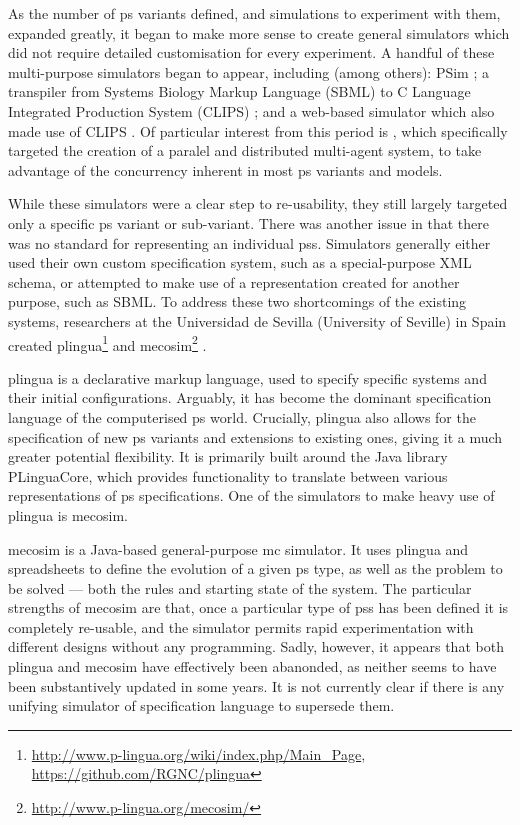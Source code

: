 As the number of \gls{ps} variants defined, and simulations to experiment with them, expanded greatly, it began to make more sense to create general simulators which did not require detailed customisation for every experiment.  A handful of these multi-purpose simulators began to appear, including (among others): PSim \cite{Bianco2007,Bianco2007a}; a transpiler from Systems Biology Markup Language (SBML) to C Language Integrated Production System (CLIPS) \cite{NepomucenoChamorro2005};  and a web-based simulator which also made use of CLIPS \cite{Bonchis2005}.  Of particular interest from this period is \cite{Acampora2007}, which specifically targeted the creation of a paralel and distributed multi-agent system, to take advantage of the concurrency inherent in most \gls{ps} variants and models.

While these simulators were a clear step to re-usability, they still largely targeted only a specific \gls{ps} variant or sub-variant.  There was another issue in that there was no standard for representing an individual \glspl{ps}.  Simulators generally either used their own custom specification system, such as a special-purpose XML schema, or attempted to make use of a representation created for another purpose, such as SBML.  To address these two shortcomings of the existing systems, researchers at the Universidad de Sevilla (University of Seville) in Spain created \gls{plingua}\footnote{\url{http://www.p-lingua.org/wiki/index.php/Main_Page}, \url{https://github.com/RGNC/plingua}} \cite{Diaz-Pernil2008a,Garcia-Quismondo2010} and \gls{mecosim}\footnote{\url{http://www.p-lingua.org/mecosim/}} \cite{Perez-Hurtado2010}.

\Gls{plingua} is a declarative markup language, used to specify specific systems and their initial configurations.  Arguably, it has become the dominant specification language of the computerised \gls{ps} world.  Crucially, \gls{plingua} also allows for the specification of new \gls{ps} variants and extensions to existing ones, giving it a much greater potential flexibility.  It is primarily built around the Java library PLinguaCore, which provides functionality to translate between various representations of \gls{ps} specifications.  One of the simulators to make heavy use of \gls{plingua} is \gls{mecosim}.

\Gls{mecosim} is a Java-based general-purpose \gls{mc} simulator.  It uses \gls{plingua} and spreadsheets to define the evolution of a given \gls{ps} type, as well as the problem to be solved --- both the rules and starting state of the system.  The particular strengths of \gls{mecosim} are that, once a particular type of \glspl{ps} has been defined it is completely re-usable, and the simulator permits rapid experimentation with different designs without any programming.  Sadly, however, it appears that both \gls{plingua} and \gls{mecosim} have effectively been abanonded, as neither seems to have been substantively updated in some years.  It is not currently clear if there is any unifying simulator of specification language to supersede them.

